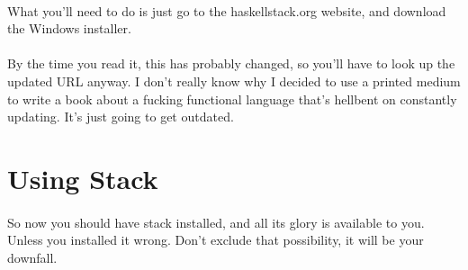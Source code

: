 \paragraph{}
What you'll need to do is just go to the haskellstack.org website, and download the Windows installer. 

\paragraph{}
By the time you read it, this has probably changed, so you'll have to look up the updated URL anyway.  I don't really know why I decided to use a printed medium to write a book about a fucking functional language that's hellbent on constantly updating. It's just going to get outdated.

\section{Using Stack}
\paragraph{}
So now you should have stack installed, and all its glory is available to you.  Unless you installed it wrong.  Don't exclude that possibility, it will be your downfall.  


\paragraph{}

